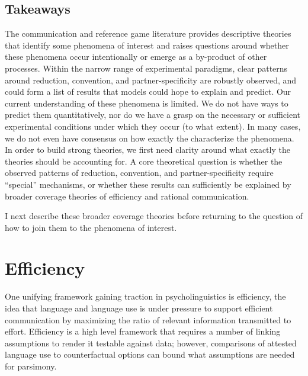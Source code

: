 \documentclass[]{article}
\begin{document}
\subsection{Takeaways} 

The communication and reference game literature provides descriptive theories that identify some phenomena of interest and raises questions around whether these phenomena occur intentionally or emerge as a by-product of other processes. Within the narrow range of experimental paradigms, clear patterns around reduction, convention, and partner-specificity are robustly observed, and could form a list of results that models could hope to explain and predict. Our current understanding of these phenomena is limited. We do not have ways to predict them quantitatively, nor do we have a grasp on the necessary or sufficient experimental conditions under which they occur (to what extent). In many cases, we do not even have consensus on how exactly the characterize the phenomena. In order to build strong theories, we first need clarity around what exactly the theories should be accounting for. A core theoretical question is whether the observed patterns of reduction, convention, and partner-specificity require ``special'' mechanisms, or whether these results can sufficiently be explained by broader coverage theories of efficiency and rational communication. 

I next describe these broader coverage theories before returning to the question of how to join them to the phenomena of interest. 




\section{Efficiency}

One unifying framework gaining traction in psycholinguistics is efficiency, the idea that language and language use is under pressure to support efficient communication by maximizing the ratio of relevant information transmitted to effort. Efficiency is a high level framework that requires a number of linking assumptions to render it testable against data; however, comparisons of attested language use to counterfactual options can bound what assumptions are needed for parsimony. 
\end{document}

